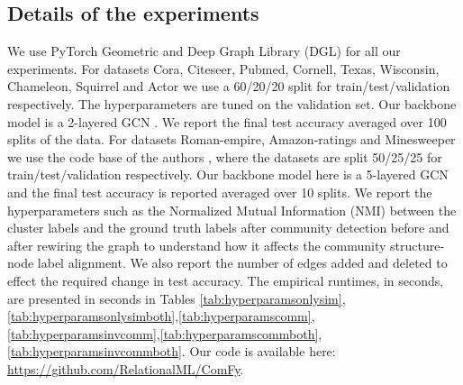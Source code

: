 \subsection{Details of the experiments}
We use PyTorch Geometric \citep{Fey/Lenssen/2019} and Deep Graph Library (DGL) \citep{wang2019dgl} for all our experiments. For datasets Cora, Citeseer, Pubmed, Cornell, Texas, Wisconsin, Chameleon, Squirrel and Actor we use a 60/20/20 split for train/test/validation respectively. The hyperparameters are tuned on the validation set. Our backbone model is a 2-layered GCN \citep{Kipf:2017tc}. We report the final test accuracy averaged over 100 splits of the data. For datasets Roman-empire, Amazon-ratings and Minesweeper we use the code base of the authors \cite{platonov2023critical}, where the datasets are split 50/25/25 for train/test/validation respectively. Our backbone model here is a 5-layered GCN and the final test accuracy is reported averaged over 10 splits. We report the hyperparameters such as the Normalized Mutual Information (NMI) between the cluster labels and the ground truth labels after community detection \citep{Blondel_2008} before and after rewiring the graph to understand how it affects the community structure-node label alignment. We also report the number of edges added and deleted to effect the required change in test accuracy. The empirical runtimes, in seconds, are presented in seconds in Tables \ref{tab:hyperparamsonlysim},\ref{tab:hyperparamsonlysimboth},\ref{tab:hyperparamscomm},\ref{tab:hyperparamsinvcomm},\ref{tab:hyperparamscommboth},\ref{tab:hyperparamsinvcommboth}. Our code is available here:
\url{https://github.com/RelationalML/ComFy}.

